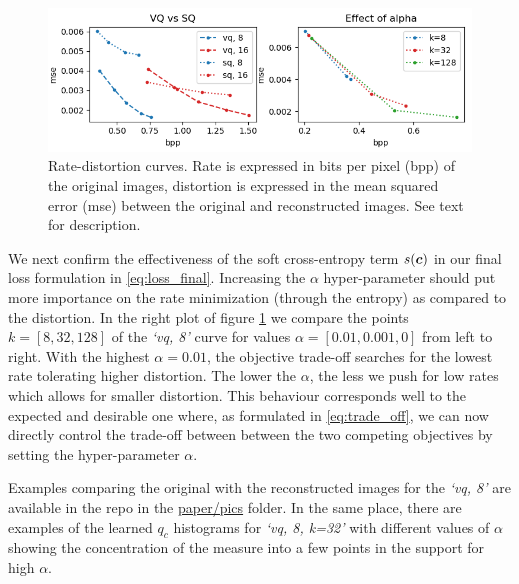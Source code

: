 \documentclass{article} %
\newcommand{\qc}{q_c}
\begin{document}
\begin{figure}[h]
\begin{center}
\includegraphics[scale=0.6]{figure1.png}
\end{center}
\caption{Rate-distortion curves. Rate is expressed in bits per pixel (bpp) of the original images, distortion is expressed in the mean squared error (mse) between the original and reconstructed images. See text for description.}\label{fig:plots}
\end{figure}

We next confirm the effectiveness of the soft cross-entropy term $s({\bm{c}})$ in our final loss formulation in \eqref{eq:loss_final}.
Increasing the $\alpha$ hyper-parameter should put more importance on the rate minimization (through the entropy) as compared to the distortion.
In the right plot of figure \ref{fig:plots} we compare the points $k=[8, 32, 128]$ of the \emph{`vq, 8'} curve for values $\alpha = [0.01, 0.001, 0]$ from left to right.
With the highest $\alpha = 0.01$, the objective trade-off searches for the lowest rate tolerating higher distortion. The lower the $\alpha$, the less we push for low rates which allows for smaller distortion. 
This behaviour corresponds well to the expected and desirable one where, as formulated in \eqref{eq:trade_off}, we can now directly control the trade-off between between the two competing objectives by setting the hyper-parameter $\alpha$.

Examples comparing the original with the reconstructed images for the \emph{`vq, 8'} are available in the repo in the \href{https://bitbucket.org/dmmlgeneva/softvqae/src/master/paper/pics}{paper/pics} folder.
In the same place, there are examples of the learned $\qc$ histograms for \emph{`vq, 8, k=32'} with different values of $\alpha$ showing the concentration of the measure into a few points in the support for high $\alpha$.







\end{document}
